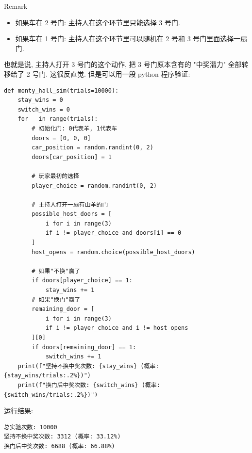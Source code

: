 \documentclass{qlnotes-export}
\begin{document}
\begin{example}
\begin{qlremark}{Remark}
\begin{itemize}
\item
  如果车在 2 号门: 主持人在这个环节里只能选择 3 号门.
\item
  如果车在 1 号门: 主持人在这个环节里可以随机在 2 号和 3 号门里面选择一扇门.
\end{itemize}

也就是说, 主持人打开 3 号门的这个动作, 把 3 号门原本含有的 "中奖潜力" 全部转移给了 2 号门. 这很反直觉. 但是可以用一段 python 程序验证:

\begin{verbatim}
def monty_hall_sim(trials=10000):
    stay_wins = 0
    switch_wins = 0
    for _ in range(trials):
        # 初始化门: 0代表羊, 1代表车
        doors = [0, 0, 0]
        car_position = random.randint(0, 2)
        doors[car_position] = 1

        # 玩家最初的选择
        player_choice = random.randint(0, 2)

        # 主持人打开一扇有山羊的门
        possible_host_doors = [
            i for i in range(3)
            if i != player_choice and doors[i] == 0
        ]
        host_opens = random.choice(possible_host_doors)

        # 如果"不换"赢了
        if doors[player_choice] == 1:
            stay_wins += 1
        # 如果"换门"赢了
        remaining_door = [
            i for i in range(3)
            if i != player_choice and i != host_opens
        ][0]
        if doors[remaining_door] == 1:
            switch_wins += 1
    print(f"坚持不换中奖次数: {stay_wins} (概率: {stay_wins/trials:.2%})")
    print(f"换门后中奖次数: {switch_wins} (概率: {switch_wins/trials:.2%})")
\end{verbatim}

运行结果:

\begin{verbatim}
总实验次数: 10000
坚持不换中奖次数: 3312 (概率: 33.12%)
换门后中奖次数: 6688 (概率: 66.88%)
\end{verbatim}

\end{qlremark}

\end{example}
\end{document}
